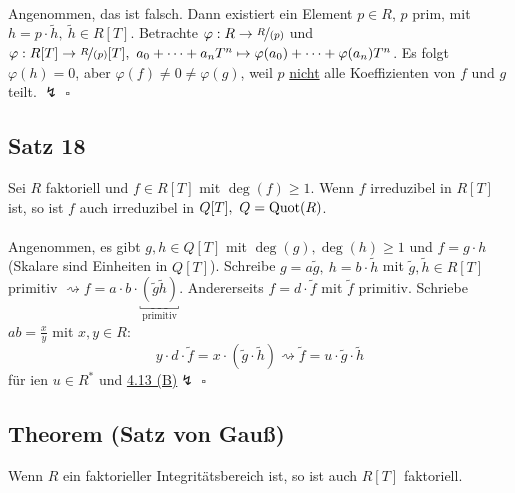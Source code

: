 \\
Angenommen, das ist falsch.
Dann existiert ein Element $p\in R$, $p$ prim, mit $h=p\cdot \tilde{h},~\tilde{h}\in R[T]$.
Betrachte $\varphi:R\to \nicefrac{R}{(p)}$  und $\varphi:R[T]\to \nicefrac{R}{(p)}[T],~ a_0+ \dots +a_nT^n\mapsto \varphi(a_0)+ \dots +\varphi(a_n)T^n$.
Es folgt $\varphi(h)=0$, aber $\varphi(f)\neq 0 \neq \varphi(g)$, weil $p$ \uline{nicht} alle Koeffizienten von $f$ und $g$ teilt. $\lightning$
\hfill $\square$

\subsection{Satz 18}
\label{sub:satz_18}
Sei $R$ faktoriell und $f\in R[T]$ mit $\deg(f)\ge 1$.
Wenn $f$ irreduzibel in $R[T]$ ist, so ist $f$ auch irreduzibel in $Q[T],~Q=\operatorname{Quot}(R)$.\\
\newpage
{}\\
Angenommen, es gibt $g,h\in Q[T]$ mit $\deg(g),\deg(h)\ge 1$ und $f=g\cdot h$ (Skalare sind Einheiten in $Q[T]$).
Schreibe $g=a\tilde{g},~h=b\cdot \tilde{h}$ mit $\tilde{g},\tilde{h}\in R[T]$ primitiv $\rightsquigarrow f=a\cdot b\cdot \underbracket{(\tilde{g}\tilde{h})}_{\text{primitiv}}$.
Andererseits $f=d\cdot \tilde{f}$ mit $\tilde{f}$ primitiv.
Schriebe $ab=\frac{x}{y}$ mit $x,y\in R$:
\[
y\cdot d\cdot \tilde{f}=x\cdot (\tilde{g}\cdot \tilde{h}) \rightsquigarrow \tilde{f}=u\cdot \tilde{g}\cdot
\tilde{h}
\]
für ien $u\in R^*$ und \hyperref[sub:vorbereitung_satz_von_gauss]{4.13 (B)}$\lightning$
\hfill $\square$

\subsection{Theorem (Satz von Gauß)}
\label{sub:satz_von_gauss}
Wenn $R$ ein faktorieller Integritätsbereich ist, so ist auch $R[T]$ faktoriell.\\

